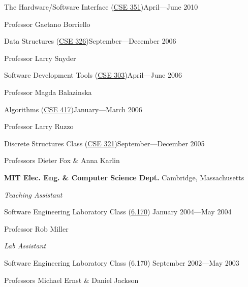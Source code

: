 \documentclass[letter]{article}
\begin{document}
\vspace{0.5\baselineskip}
\par
The Hardware/Software Interface (\href{http://www.cs.washington.edu/education/courses/351/10sp/}{CSE 351})\hfill April---June 2010
\par
Professor Gaetano Borriello

\vspace{0.5\baselineskip}
\par
Data Structures (\href{http://www.cs.washington.edu/education/courses/326/06au/}{CSE 326})\hfill September---December 2006
\par
Professor Larry Snyder

\vspace{0.5\baselineskip}
\par
Software Development Tools (\href{http://www.cs.washington.edu/education/courses/303/06sp/}{CSE 303})\hfill April---June 2006
\par
Professor Magda Balazinska

\vspace{0.5\baselineskip}
\par
Algorithms (\href{http://www.cs.washington.edu/education/courses/417/06wi/}{CSE 417})\hfill January---March 2006
\par
Professor Larry Ruzzo

\vspace{0.5\baselineskip}
\par
Discrete Structures Class (\href{http://www.cs.washington.edu/education/courses/321/05au/}{CSE 321})\hfill September---December 2005
\par
Professors Dieter Fox \& Anna Karlin
\par

\vspace{\baselineskip}
\par
{\bf MIT Elec. Eng. \& Computer Science Dept.} \hfill Cambridge, Massachusetts

\vspace{0.5\baselineskip}
\par
{\em Teaching Assistant}
\par
Software Engineering Laboratory Class (\href{http://courses.csail.mit.edu/6.170/old-www/2004-Spring/admin-info/generalinfo.html#Staff}{6.170}) \hfill January 2004---May 2004
\par
Professor Rob Miller

\vspace{0.5\baselineskip}
\par
{\em Lab Assistant}
\par
Software Engineering Laboratory Class (6.170) \hfill September 2002---May 2003
\par
Professors Michael Ernst \& Daniel Jackson
\par
\end{document}
